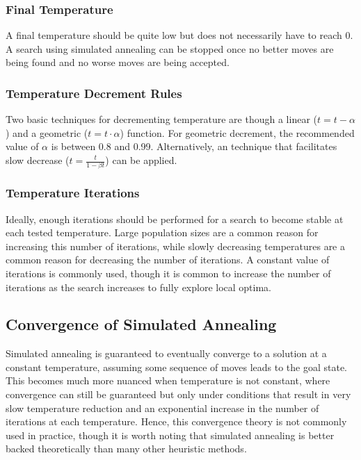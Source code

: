 \documentclass[12pt,titlepage]{article}
\begin{document}
      \subsubsection{Final Temperature}
        A final temperature should be quite low but does not necessarily have to reach 0. A search using simulated annealing can be stopped once no better moves are being found and no
        worse moves are being accepted.

      \subsubsection{Temperature Decrement Rules}
        Two basic techniques for decrementing temperature are though a linear ($t = t - \alpha$) and a geometric ($t = t \cdot \alpha$) function. For geometric decrement, the recommended
        value of $\alpha$ is between 0.8 and 0.99. Alternatively, an technique that facilitates slow decrease ($t = \frac{t}{1 - \beta t}$) can be applied.

      \subsubsection{Temperature Iterations}
        Ideally, enough iterations should be performed for a search to become stable at each tested temperature. Large population sizes are a common reason for increasing this number
        of iterations, while slowly decreasing temperatures are a common reason for decreasing the number of iterations. A constant value of iterations is commonly used, though
        it is common to increase the number of iterations as the search increases to fully explore local optima.

    \subsection{Convergence of Simulated Annealing}
      Simulated annealing is guaranteed to eventually converge to a solution at a constant temperature, assuming some sequence of moves leads to the goal state. This becomes much
      more nuanced when temperature is not constant, where convergence can still be guaranteed but only under conditions that result in very slow temperature reduction and an
      exponential increase in the number of iterations at each temperature. Hence, this convergence theory is not commonly used in practice, though it is worth noting that
      simulated annealing is better backed theoretically than many other heuristic methods.
\end{document}
